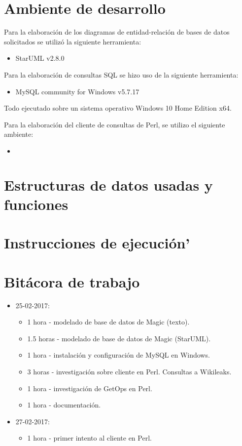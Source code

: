 \documentclass{IEEEtran}
\begin{document}
\section{Ambiente de desarrollo}
Para la elaboraci\'on de los diagramas de entidad-relaci\'on de bases de datos solicitados se utiliz\'o la siguiente herramienta:
\begin{itemize}
  \item StarUML v2.8.0
\end{itemize}

Para la elaboraci\'on de consultas SQL se hizo uso de la siguiente herramienta:
\begin{itemize}
  \item MySQL community for Windows v5.7.17
\end{itemize}
Todo ejecutado sobre un sistema operativo Windows 10 Home Edition x64.

Para la elaboraci\'on del cliente de consultas de Perl, se utilizo el siguiente ambiente:
\begin{itemize}
  \item
\end{itemize}

\section{Estructuras de datos usadas y funciones}

\section{Instrucciones de ejecuci\'on'}

\section{Bit\'acora de trabajo}
\begin{itemize}
  \item 25-02-2017:
  \begin{itemize}
    \item 1 hora - modelado de base de datos de Magic (texto).
    \item 1.5 horas - modelado de base de datos de Magic (StarUML).
    \item 1 hora - instalaci\'on y configuraci\'on de MySQL en Windows.
    \item 3 horas - investigaci\'on sobre cliente en Perl. Consultas a Wikileaks.
    \item 1 hora - investigaci\'on de GetOps en Perl.
    \item 1 hora - documentaci\'on.
  \end{itemize}
  \item 27-02-2017:
  \begin{itemize}
    \item 1 hora - primer intento al cliente en Perl.
  \end{itemize}
\end{itemize}
\end{document}
